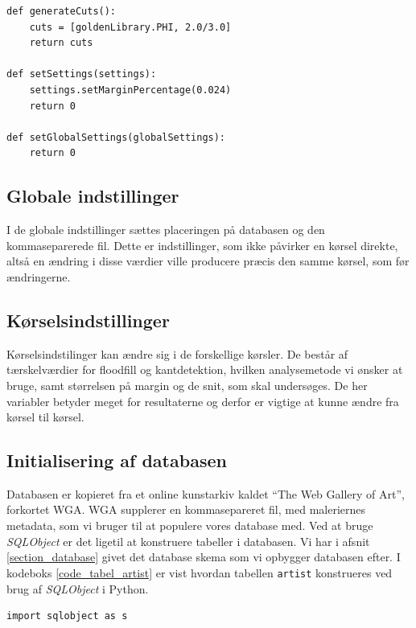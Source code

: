 {\begin{lstlisting}[caption={Pseudokode for et experiment, som checker på
    $\varPhi$ og $\frac{2}{3}$}, frame=tb, label={pseudo_experiment},
    captionpos=b, float=h]
def generateCuts():
	cuts = [goldenLibrary.PHI, 2.0/3.0]
	return cuts

def setSettings(settings):
	settings.setMarginPercentage(0.024)
	return 0

def setGlobalSettings(globalSettings):
	return 0
\end{lstlisting}

\subsection{Globale indstillinger}
I de globale indstillinger sættes placeringen på databasen og den
kommaseparerede fil. Dette er indstillinger, som ikke påvirker en kørsel
direkte, altså en ændring i disse værdier ville producere præcis
den samme kørsel, som før ændringerne. 

\subsection{Kørselsindstillinger}
Kørselsindstilinger kan ændre sig i de forskellige kørsler. De består af
tærskelværdier for floodfill og kantdetektion, hvilken analysemetode vi
ønsker at bruge, samt størrelsen på margin og de snit, som skal
undersøges. De her variabler betyder meget for resultaterne og derfor er
vigtige at kunne ændre fra kørsel til kørsel.

\subsection{Initialisering af databasen}
Databasen er kopieret fra et online kunstarkiv kaldet ``The Web Gallery
of Art''\cite{wgahu}, forkortet WGA. WGA supplerer en kommasepareret fil, med
maleriernes metadata, som vi bruger til at populere vores database med.
Ved at bruge \emph{SQLObject} er det ligetil at konstruere tabeller i
databasen. Vi har i afsnit \ref{section_database} givet det database
skema som vi opbygger databasen efter. I kodeboks
\ref{code_tabel_artist} er vist hvordan tabellen \texttt{artist}
konstrueres ved brug af \emph{SQLObject} i Python.

\begin{lstlisting}[caption={Pythonkode for oprettelse af tabeller i
    databasen.}, captionpos=b, label={code_tabel_artist}, frame=tb,
    breaklines=false, float=hb]
import sqlobject as s


\end{lstlisting}}
